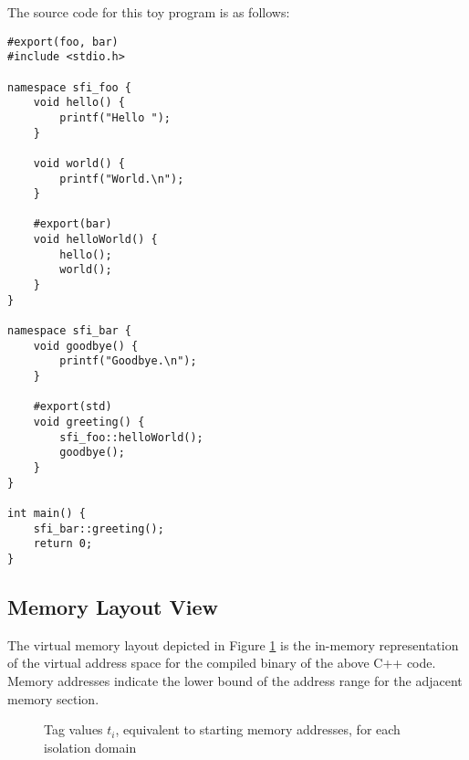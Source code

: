 \documentclass[12pt]{article}
\begin{document}
\noindent The source code for this toy program is as follows:

\begin{verbatim}
#export(foo, bar)
#include <stdio.h>

namespace sfi_foo {
	void hello() {
		printf("Hello ");
	}
	
	void world() {
		printf("World.\n");
	}
	
	#export(bar)
	void helloWorld() {
		hello();
		world();
	}
}

namespace sfi_bar {
	void goodbye() {
		printf("Goodbye.\n");
	}
	
	#export(std)
	void greeting() {
		sfi_foo::helloWorld();
		goodbye();
	}
}

int main() {
	sfi_bar::greeting();
	return 0;
}

\end{verbatim}

\subsection{Memory Layout View}

The virtual memory layout depicted in Figure \ref{domains_mem} is the in-memory representation of the virtual address space for the compiled binary of the above C++ code. Memory addresses indicate the lower bound of the address range for the adjacent memory section.\\

\begin{figure}[p]
\begin{drawstack}[scale=0.75]
	\footnotesize
	\startframe
		 
	\startframe
		 
	\startframe
		 
	\startframe
		 
	\startframe
		 
\end{drawstack}
\caption{Tag values $t_i$, equivalent to starting memory addresses, for each isolation domain} \label{domains_mem}
\end{figure}
\end{document}
